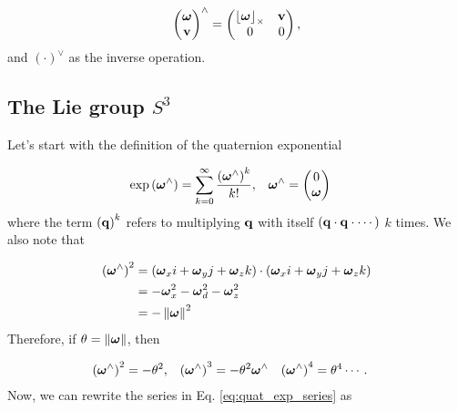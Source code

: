\[
\begin{pmatrix}\boldsymbol{\omega}\\
\mathbf{v}
\end{pmatrix}^{\wedge}=\begin{pmatrix}\left\lfloor\boldsymbol{\omega}\right\rfloor_{\times} & \mathbf{v}\\
0 & 0
\end{pmatrix},
\]
and $\left(\cdot\right)^{\vee}$ as the inverse operation.


\subsection{The Lie group $S^3$}

Let's start with the definition of the quaternion exponential

\begin{align}
\exp\left(\omegabf^{\wedge}\right) & =\sum_{k=0}^{\infty}\frac{\left(\omegabf^{\wedge}\right)^{k}}{k!}, & \omegabf^{\wedge} & =\begin{pmatrix}0\\
\omegabf
\end{pmatrix}\label{eq:quat_exp_series}
\end{align}
where the term $\left(\mathbf{q}\right)^{k}$ refers to multiplying $\mathbf{q}$
with itself $\left(\mathbf{q}\cdot\mathbf{q}\cdot\cdots\right)$ $k$ times. We also
note that

\begin{align*}
\left(\boldsymbol{\omega}^{\wedge}\right)^{2} & =\left(\boldsymbol{\omega}_{x}i+\boldsymbol{\omega}_{y}j+\boldsymbol{\omega}_{z}k\right)\cdot\left(\boldsymbol{\omega}_{x}i+\boldsymbol{\omega}_{y}j+\boldsymbol{\omega}_{z}k\right)\\
 & =-\boldsymbol{\omega}_{x}^{2}-\boldsymbol{\omega}_{d}^{2}-\boldsymbol{\omega}_{z}^{2}\\
 & =-\left\|\boldsymbol{\omega}\right\|^{2}
\end{align*}
Therefore, if $\theta=\left\|\boldsymbol{\omega}\right\|$, then

\begin{align*}
\left(\boldsymbol{\omega}^{\wedge}\right)^{2} & =-\theta^{2}, & \left(\boldsymbol{\omega}^{\wedge}\right)^{3} & =-\theta^{2}\boldsymbol{\omega}^{\wedge} & \left(\boldsymbol{\omega}^{\wedge}\right)^{4} & =\theta^{4}\cdots.
\end{align*}
Now, we can rewrite the series in Eq. \ref{eq:quat_exp_series} as

